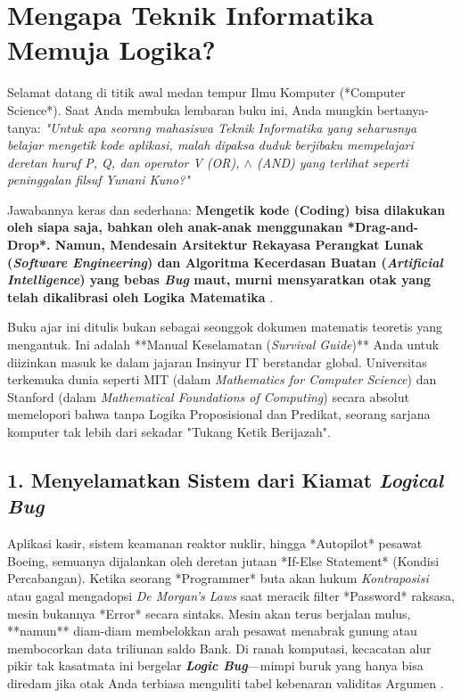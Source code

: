 \section{Mengapa Teknik Informatika Memuja Logika?}

Selamat datang di titik awal medan tempur Ilmu Komputer (*Computer Science*). Saat Anda membuka lembaran buku ini, Anda mungkin bertanya-tanya: \textit{"Untuk apa seorang mahasiswa Teknik Informatika yang seharusnya belajar mengetik kode aplikasi, malah dipaksa duduk berjibaku mempelajari deretan huruf P, Q, dan operator V (OR), $\land$ (AND) yang terlihat seperti peninggalan filsuf Yunani Kuno?"} \cite{rosen2019,copi2014}

Jawabannya keras dan sederhana: \textbf{Mengetik kode (Coding) bisa dilakukan oleh siapa saja, bahkan oleh anak-anak menggunakan *Drag-and-Drop*. Namun, Mendesain Arsitektur Rekayasa Perangkat Lunak (\textit{Software Engineering}) dan Algoritma Kecerdasan Buatan (\textit{Artificial Intelligence}) yang bebas \textit{Bug} maut, murni mensyaratkan otak yang telah dikalibrasi oleh Logika Matematika} \cite{levin_discrete,stanford_cs103}.

Buku ajar ini ditulis bukan sebagai seonggok dokumen matematis teoretis yang mengantuk. Ini adalah **Manual Keselamatan (\textit{Survival Guide})** Anda untuk diizinkan masuk ke dalam jajaran Insinyur IT berstandar global. Universitas terkemuka dunia seperti MIT (dalam \textit{Mathematics for Computer Science}) dan Stanford (dalam \textit{Mathematical Foundations of Computing}) \cite{mit_6042,stanford_cs103} secara absolut memelopori bahwa tanpa Logika Proposisional dan Predikat, seorang sarjana komputer tak lebih dari sekadar "Tukang Ketik Berijazah".

\subsection{1. Menyelamatkan Sistem dari Kiamat \textit{Logical Bug}}

Aplikasi kasir, sistem keamanan reaktor nuklir, hingga *Autopilot* pesawat Boeing, semuanya dijalankan oleh deretan jutaan *If-Else Statement* (Kondisi Percabangan). Ketika seorang *Programmer* buta akan hukum \textit{Kontraposisi} atau gagal mengadopsi \textit{De Morgan's Laws} saat meracik filter *Password* raksasa, mesin bukannya *Error* secara sintaks. Mesin akan terus berjalan mulus, **namun** diam-diam membelokkan arah pesawat menabrak gunung atau membocorkan data triliunan saldo Bank. Di ranah komputasi, kecacatan alur pikir tak kasatmata ini bergelar \textbf{\textit{Logic Bug}}---mimpi buruk yang hanya bisa diredam jika otak Anda terbiasa menguliti tabel kebenaran validitas Argumen \cite{forallx,iep_natded}.

